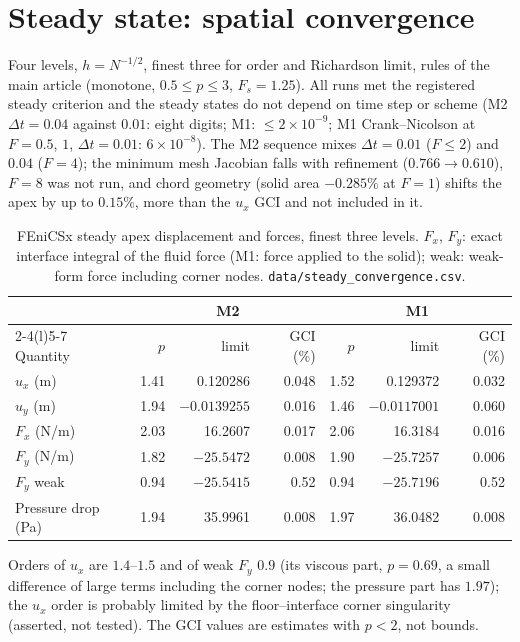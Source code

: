 \documentclass[sn-mathphys,Numbered]{sn-jnl}
\begin{document}
\section{Steady state: spatial convergence}\label{sec:fx_steady}
Four levels, $h=N^{-1/2}$, finest three for order and Richardson limit, rules of the main article (monotone, $0.5\le p\le3$, $F_s=1.25$).
All runs met the registered steady criterion and the steady states do not depend on time step or scheme (M2 $\Delta t=0.04$ against $0.01$: eight digits; M1: $\le2\times10^{-9}$; M1 Crank--Nicolson at $F=0.5$, $1$, $\Delta t=0.01$: $6\times10^{-8}$).
The M2 sequence mixes $\Delta t=0.01$ ($F\le2$) and $0.04$ ($F=4$); the minimum mesh Jacobian falls with refinement ($0.766\to0.610$), $F=8$ was not run, and chord geometry (solid area $-0.285\%$ at $F=1$) shifts the apex by up to $0.15\%$, more than the $u_x$ GCI and not included in it.

\begin{table}[htbp]
\centering
\caption{FEniCSx steady apex displacement and forces, finest three levels. $F_x$, $F_y$: exact interface integral of the fluid force (M1: force applied to the solid); weak: weak-form force including corner nodes. \texttt{data/steady\_convergence.csv}.}\label{tab:fx_steady}
\small
\begin{tabular}{@{}lrrrrrr@{}}
\toprule
 & \multicolumn{3}{c}{M2} & \multicolumn{3}{c}{M1} \\
\cmidrule(r){2-4}\cmidrule(l){5-7}
Quantity & $p$ & limit & GCI (\%) & $p$ & limit & GCI (\%) \\
\midrule
$u_x$ (m) & 1.41 & 0.120286 & 0.048 & 1.52 & 0.129372 & 0.032 \\
$u_y$ (m) & 1.94 & $-0.0139255$ & 0.016 & 1.46 & $-0.0117001$ & 0.060 \\
$F_x$ (N/m) & 2.03 & 16.2607 & 0.017 & 2.06 & 16.3184 & 0.016 \\
$F_y$ (N/m) & 1.82 & $-25.5472$ & 0.008 & 1.90 & $-25.7257$ & 0.006 \\
$F_y$ weak & 0.94 & $-25.5415$ & 0.52 & 0.94 & $-25.7196$ & 0.52 \\
Pressure drop (Pa) & 1.94 & 35.9961 & 0.008 & 1.97 & 36.0482 & 0.008 \\
\bottomrule
\end{tabular}
\end{table}
Orders of $u_x$ are $1.4$--$1.5$ and of weak $F_y$ $0.9$ (its viscous part, $p=0.69$, a small difference of large terms including the corner nodes; the pressure part has $1.97$); the $u_x$ order is probably limited by the floor--interface corner singularity (asserted, not tested). The GCI values are estimates with $p<2$, not bounds.
\end{document}
